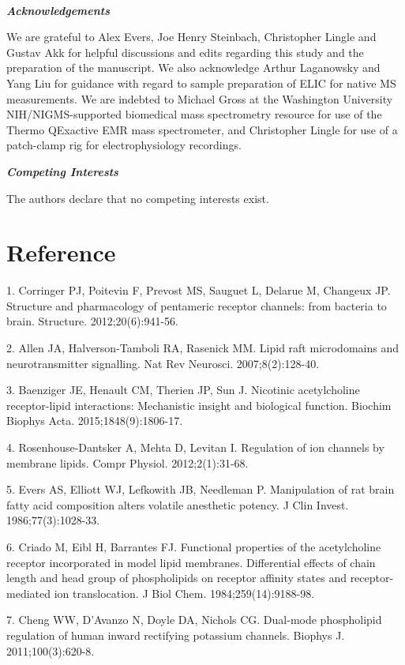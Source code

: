 \textbf{\emph{\\
}}

\textbf{\emph{Acknowledgements}}

We are grateful to Alex Evers, Joe Henry Steinbach, Christopher Lingle
and Gustav Akk for helpful discussions and edits regarding this study
and the preparation of the manuscript. We also acknowledge Arthur
Laganowsky and Yang Liu for guidance with regard to sample preparation
of ELIC for native MS measurements. We are indebted to Michael Gross at
the Washington University NIH/NIGMS-supported biomedical mass
spectrometry resource for use of the Thermo QExactive EMR mass
spectrometer, and Christopher Lingle for use of a patch-clamp rig for
electrophysiology recordings.

\textbf{\emph{Competing Interests}}

The authors declare that no competing interests exist.

\section{Reference}

1. Corringer PJ, Poitevin F, Prevost MS, Sauguet L, Delarue M, Changeux
JP. Structure and pharmacology of pentameric receptor channels: from
bacteria to brain. Structure. 2012;20(6):941-56.

2. Allen JA, Halverson-Tamboli RA, Rasenick MM. Lipid raft microdomains
and neurotransmitter signalling. Nat Rev Neurosci. 2007;8(2):128-40.

3. Baenziger JE, Henault CM, Therien JP, Sun J. Nicotinic acetylcholine
receptor-lipid interactions: Mechanistic insight and biological
function. Biochim Biophys Acta. 2015;1848(9):1806-17.

4. Rosenhouse-Dantsker A, Mehta D, Levitan I. Regulation of ion channels
by membrane lipids. Compr Physiol. 2012;2(1):31-68.

5. Evers AS, Elliott WJ, Lefkowith JB, Needleman P. Manipulation of rat
brain fatty acid composition alters volatile anesthetic potency. J Clin
Invest. 1986;77(3):1028-33.

6. Criado M, Eibl H, Barrantes FJ. Functional properties of the
acetylcholine receptor incorporated in model lipid membranes.
Differential effects of chain length and head group of phospholipids on
receptor affinity states and receptor-mediated ion translocation. J Biol
Chem. 1984;259(14):9188-98.

7. Cheng WW, D'Avanzo N, Doyle DA, Nichols CG. Dual-mode phospholipid
regulation of human inward rectifying potassium channels. Biophys J.
2011;100(3):620-8.

